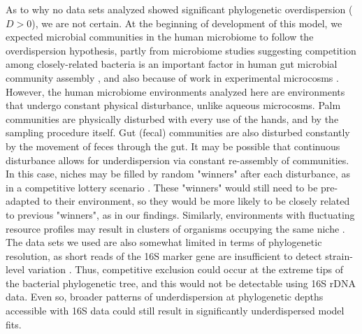 \documentclass{article}
\begin{document}
As to why no data sets analyzed showed significant phylogenetic overdispersion (\(D > 0\)), we are not certain. At the beginning of development of this model, we expected microbial communities in the human microbiome to follow the overdispersion hypothesis, partly from microbiome studies suggesting competition among closely-related bacteria is an important factor in human gut microbial community assembly \cite{Chatzidaki-Livanis3627,Hecht1281,Nemergut2013}, and also because of work in experimental microcosms \cite{Peay2012}. However, the human microbiome environments analyzed here are environments that undergo constant physical disturbance, unlike aqueous microcosms. Palm communities are physically disturbed with every use of the hands, and by the sampling procedure itself. Gut (fecal) communities are also disturbed constantly by the movement of feces through the gut. It may be possible that continuous disturbance allows for underdispersion via constant re-assembly of communities. In this case, niches may be filled by random "winners" after each disturbance, as in a competitive lottery scenario \cite{Verster2018}. These "winners" would still need to be pre-adapted to their environment, so they would be more likely to be closely related to previous "winners", as in our findings. Similarly, environments with fluctuating resource profiles may result in clusters of organisms occupying the same niche \cite{Sakavara738}. The data sets we used are also somewhat limited in terms of phylogenetic resolution, as short reads of the 16S marker gene are insufficient to detect strain-level variation \cite{Morowitz1128,Hecht1281,Tett2019}. Thus, competitive exclusion could occur at the extreme tips of the bacterial phylogenetic tree, and this would not be detectable using 16S rDNA data. Even so, broader patterns of underdispersion at phylogenetic depths accessible with 16S data could still result in significantly underdispersed model fits.
\par
\end{document}
